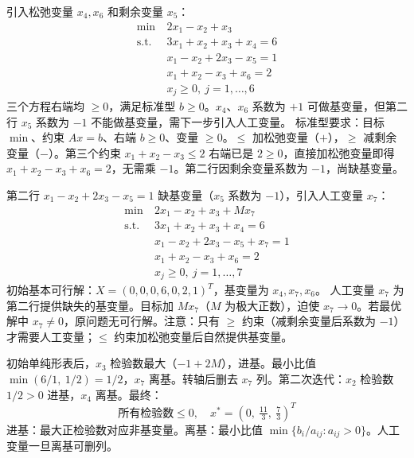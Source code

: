   {引入松弛变量 $x_4,x_6$ 和剩余变量 $x_5$：
  \begin{align*}
    \min\ & 2x_1 - x_2 + x_3 \\
    \text{s.t.}\ & 3x_1 + x_2 + x_3 + x_4 = 6 \\
    & x_1 - x_2 + 2x_3 - x_5 = 1 \\
    & x_1 + x_2 - x_3 + x_6 = 2 \\
    & x_j \ge 0,\ j=1,\dots,6
  \end{align*}
  三个方程右端均 $\ge 0$，满足标准型 $b\ge 0$。$x_4$、$x_6$ 系数为 $+1$ 可做基变量，但第二行 $x_5$ 系数为 $-1$ 不能做基变量，需下一步引入人工变量。}
  {标准型要求：目标 $\min$、约束 $Ax=b$、右端 $b\ge 0$、变量 $\ge 0$。$\le$ 加松弛变量（$+$），$\ge$ 减剩余变量（$-$）。第三个约束 $x_1+x_2-x_3\le 2$ 右端已是 $2\ge 0$，直接加松弛变量即得 $x_1+x_2-x_3+x_6=2$，无需乘 $-1$。第二行因剩余变量系数为 $-1$，尚缺基变量。}
  {\par\vspace{4pt}}
  {第二行 $x_1-x_2+2x_3-x_5=1$ 缺基变量（$x_5$ 系数为 $-1$），引入人工变量 $x_7$：
  \begin{align*}
    \min\ & 2x_1 - x_2 + x_3 + Mx_7 \\
    \text{s.t.}\ & 3x_1 + x_2 + x_3 + x_4 = 6 \\
    & x_1 - x_2 + 2x_3 - x_5 + x_7 = 1 \\
    & x_1 + x_2 - x_3 + x_6 = 2 \\
    & x_j \ge 0,\ j=1,\dots,7
  \end{align*}
  初始基本可行解：$X = (0,0,0,6,0,2,1)^T$，基变量为 $x_4,x_7,x_6$。}
  {人工变量 $x_7$ 为第二行提供缺失的基变量。目标加 $Mx_7$（$M$ 为极大正数），迫使 $x_7\to 0$。若最优解中 $x_7\neq 0$，原问题无可行解。注意：只有 $\ge$ 约束（减剩余变量后系数为 $-1$）才需要人工变量；$\le$ 约束加松弛变量后自然提供基变量。}
  {\par\vspace{4pt}}
  {初始单纯形表后，$x_3$ 检验数最大（$-1+2M$），进基。最小比值 $\min(6/1,\ 1/2)=1/2$，$x_7$ 离基。转轴后删去 $x_7$ 列。第二次迭代：$x_2$ 检验数 $1/2>0$ 进基，$x_4$ 离基。最终：
  \[
  \text{所有检验数}\le 0,\quad x^* = (0,\ \tfrac{11}{3},\ \tfrac{7}{3})^T
  \]}
  {进基：最大正检验数对应非基变量。离基：最小比值 $\min\{b_i/a_{ij}: a_{ij}>0\}$。人工变量一旦离基可删列。}
  {\par\vspace{4pt}}
